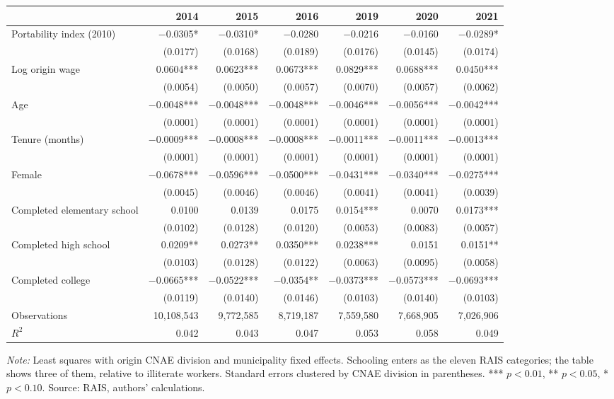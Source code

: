{\footnotesize
\setlength{\tabcolsep}{3.5pt}
\begin{threeparttable}
\begin{tabular}{lrrrrrr}
\toprule
 & 2014 & 2015 & 2016 & 2019 & 2020 & 2021 \\
\midrule
Portability index (2010) & $-$0.0305* & $-$0.0310* & $-$0.0280 & $-$0.0216 & $-$0.0160 & $-$0.0289* \\
 & (0.0177) & (0.0168) & (0.0189) & (0.0176) & (0.0145) & (0.0174) \\
Log origin wage & 0.0604*** & 0.0623*** & 0.0673*** & 0.0829*** & 0.0688*** & 0.0450*** \\
 & (0.0054) & (0.0050) & (0.0057) & (0.0070) & (0.0057) & (0.0062) \\
Age & $-$0.0048*** & $-$0.0048*** & $-$0.0048*** & $-$0.0046*** & $-$0.0056*** & $-$0.0042*** \\
 & (0.0001) & (0.0001) & (0.0001) & (0.0001) & (0.0001) & (0.0001) \\
Tenure (months) & $-$0.0009*** & $-$0.0008*** & $-$0.0008*** & $-$0.0011*** & $-$0.0011*** & $-$0.0013*** \\
 & (0.0001) & (0.0001) & (0.0001) & (0.0001) & (0.0001) & (0.0001) \\
Female & $-$0.0678*** & $-$0.0596*** & $-$0.0500*** & $-$0.0431*** & $-$0.0340*** & $-$0.0275*** \\
 & (0.0045) & (0.0046) & (0.0046) & (0.0041) & (0.0041) & (0.0039) \\
Completed elementary school & 0.0100 & 0.0139 & 0.0175 & 0.0154*** & 0.0070 & 0.0173*** \\
 & (0.0102) & (0.0128) & (0.0120) & (0.0053) & (0.0083) & (0.0057) \\
Completed high school & 0.0209** & 0.0273** & 0.0350*** & 0.0238*** & 0.0151 & 0.0151** \\
 & (0.0103) & (0.0128) & (0.0122) & (0.0063) & (0.0095) & (0.0058) \\
Completed college & $-$0.0665*** & $-$0.0522*** & $-$0.0354** & $-$0.0373*** & $-$0.0573*** & $-$0.0693*** \\
 & (0.0119) & (0.0140) & (0.0146) & (0.0103) & (0.0140) & (0.0103) \\
\midrule
Observations & 10,108,543 & 9,772,585 & 8,719,187 & 7,559,580 & 7,668,905 & 7,026,906 \\
$R^2$ & 0.042 & 0.043 & 0.047 & 0.053 & 0.058 & 0.049 \\
\bottomrule
\end{tabular}
\begin{tablenotes}[flushleft]\footnotesize
\item \textit{Note:} Least squares with origin CNAE division and municipality fixed effects. Schooling enters as the eleven RAIS categories; the table shows three of them, relative to illiterate workers. Standard errors clustered by CNAE division in parentheses. *** $p<0.01$, ** $p<0.05$, * $p<0.10$. Source: RAIS, authors' calculations.
\end{tablenotes}
\end{threeparttable}
}
